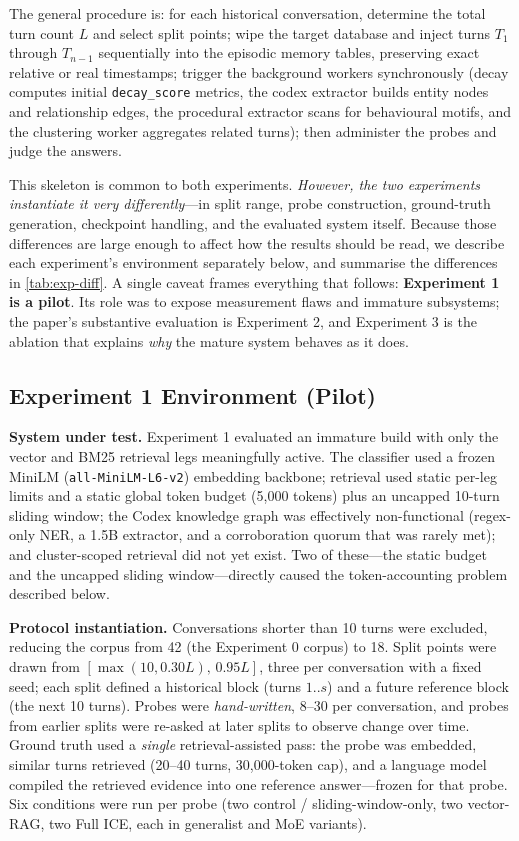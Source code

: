 \documentclass[11pt,a4paper]{article}
\begin{document}
The general procedure is: for each historical conversation, determine the total turn count $L$ and select split points; wipe the target database and inject turns $T_1$ through $T_{n-1}$ sequentially into the episodic memory tables, preserving exact relative or real timestamps; trigger the background workers synchronously (decay computes initial \texttt{decay\_score} metrics, the codex extractor builds entity nodes and relationship edges, the procedural extractor scans for behavioural motifs, and the clustering worker aggregates related turns); then administer the probes and judge the answers.

This skeleton is common to both experiments. \emph{However, the two experiments instantiate it very differently}---in split range, probe construction, ground-truth generation, checkpoint handling, and the evaluated system itself. Because those differences are large enough to affect how the results should be read, we describe each experiment's environment separately below, and summarise the differences in \cref{tab:exp-diff}. A single caveat frames everything that follows: \textbf{Experiment 1 is a pilot}. Its role was to expose measurement flaws and immature subsystems; the paper's substantive evaluation is Experiment 2, and Experiment 3 is the ablation that explains \emph{why} the mature system behaves as it does.

\subsection{Experiment 1 Environment (Pilot)}
\label{sec:exp1-env}

\textbf{System under test.} Experiment 1 evaluated an immature build with only the vector and BM25 retrieval legs meaningfully active. The classifier used a frozen MiniLM (\texttt{all-MiniLM-L6-v2}) embedding backbone; retrieval used static per-leg limits and a static global token budget (5{,}000 tokens) plus an uncapped 10-turn sliding window; the Codex knowledge graph was effectively non-functional (regex-only NER, a 1.5B extractor, and a corroboration quorum that was rarely met); and cluster-scoped retrieval did not yet exist. Two of these---the static budget and the uncapped sliding window---directly caused the token-accounting problem described below.

\textbf{Protocol instantiation.} Conversations shorter than 10 turns were excluded, reducing the corpus from 42 (the Experiment 0 corpus) to 18. Split points were drawn from $[\max(10,0.30L),\,0.95L]$, three per conversation with a fixed seed; each split defined a historical block (turns $1..s$) and a future reference block (the next 10 turns). Probes were \emph{hand-written}, 8--30 per conversation, and probes from earlier splits were re-asked at later splits to observe change over time. Ground truth used a \emph{single} retrieval-assisted pass: the probe was embedded, similar turns retrieved (20--40 turns, 30{,}000-token cap), and a language model compiled the retrieved evidence into one reference answer---frozen for that probe. Six conditions were run per probe (two control / sliding-window-only, two vector-RAG, two Full ICE, each in generalist and MoE variants).
\end{document}
